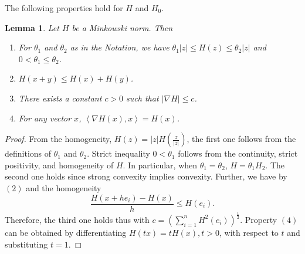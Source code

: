 \documentclass[11pt]{amsart}
\newtheorem{lemma}[theorem]{Lemma}
\newcommand{\D}{\nabla}
\numberwithin{equation}{section}
\begin{document}
The following properties hold for $H$ and $H_{0}$.

 \begin{lemma}\label{lemma_properties of H}
    Let $H$ be a Minkowski norm. Then
    \begin{enumerate}
        \item For $\theta_{1}$ and $\theta_{2}$ as in the Notation, we have $\theta_{1}|z|\leq H\left(z\right)\leq \theta_{2}|z|$ and $0<\theta_{1}\leq \theta_{2}$.
        \item $H\left(x+y\right)\leq H\left(x\right)+H\left(y\right)$.  
\item There exists a constant $c>0$ such that $|\D H|\leq c$.
\item For any vector $x$, $\left<\D H(x), x\right>=H\left(x\right)$.
\end{enumerate}
\end{lemma}
\begin{proof}
    From the homogeneity,  $H\left(z\right)=|z|H\left(\frac{z}{|z|}\right)$, the first one follows from the definitions of $\theta_{1}$ and $\theta_{2}$. Strict inequality $0<\theta_{1}$ follows from the continuity, strict positivity, and homogeneity of $H$. In particular, when $\theta_{1}=\theta_{2}$, $H=\theta_{1}H_{2}$.
The second one holds since strong convexity implies convexity.
    Further, we have by $(2)$ and the homogeneity 
    \begin{equation*}
    \frac{H\left(x+he_{i}\right)-H\left(x\right)}{h}\leq H\left(e_{i}\right). 
    \end{equation*}
    Therefore, the third one holds thus with $c=\left(\displaystyle\sum_{i=1}^{n}H^{2}(e_{i})\right)^{\frac{1}{2}}$.
     Property $(4)$ can be obtained by differentiating $H\left(tx\right)=t H\left(x\right), t>0$, with respect to $t$ and substituting $t=1$.
\end{proof}
\end{document}
